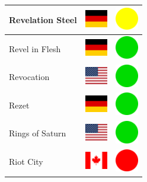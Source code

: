 \documentclass[12pt, a4paper, twoside]{report}
\begin{document}
\begin{center}
\begin{longtable}{|p{5cm}|p{2cm}|p{2cm}|}
 Revelation Steel                                           & \includegraphics[width=1cm]{4x3/de} &   \includegraphics[width=1cm]{likes/m} \\ \hline
 Revel in Flesh                                             & \includegraphics[width=1cm]{4x3/de} &   \includegraphics[width=1cm]{likes/y} \\ \hline
 Revocation                                                 & \includegraphics[width=1cm]{4x3/us} &   \includegraphics[width=1cm]{likes/y} \\ \hline
 Rezet                                                      & \includegraphics[width=1cm]{4x3/de} &   \includegraphics[width=1cm]{likes/y} \\ \hline
 Rings of Saturn                                            & \includegraphics[width=1cm]{4x3/us} &   \includegraphics[width=1cm]{likes/y} \\ \hline
 Riot City                                                  & \includegraphics[width=1cm]{4x3/ca} &   \includegraphics[width=1cm]{likes/n} \\ \hline

\end{longtable}
\end{center}
\end{document}
